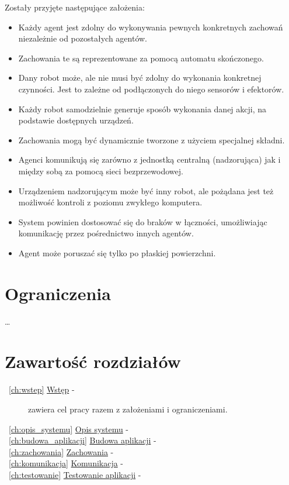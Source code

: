 Zostały przyjęte następujące założenia:
\begin{itemize}
  \item Każdy agent jest zdolny do wykonywania pewnych konkretnych zachowań niezależnie od pozostałych agentów.
  \item Zachowania te są reprezentowane za pomocą automatu skończonego.
  \item Dany robot może, ale nie musi być zdolny do wykonania konkretnej czynności. Jest to zależne od podłączonych do niego sensorów i efektorów.
  \item Każdy robot samodzielnie generuje sposób wykonania danej akcji, na podstawie dostępnych urządzeń.
  \item Zachowania mogą być dynamicznie tworzone z użyciem specjalnej składni.
  \item Agenci komunikują się zarówno z jednostką centralną (nadzorująca) jak i między sobą za pomocą sieci bezprzewodowej.
  \item Urządzeniem nadzorującym może być inny robot, ale pożądana jest też możliwość kontroli z poziomu zwykłego komputera.
  \item System powinien dostosować się do braków w łączności, umożliwiając komunikację przez pośrednictwo innych agentów.
  \item Agent może poruszać się tylko po płaskiej powierzchni.
\end{itemize}

\section{Ograniczenia}

\ldots

\section{Zawartość rozdziałów}

\begin{description}
  \item[ {~\ref{ch:wstep} \hyperref[ch:wstep]{Wstęp} -} ]zawiera cel pracy razem z założeniami i ograniczeniami.
  \item[ {~\ref{ch:opis_systemu} \hyperref[ch:opis_systemu]{Opis systemu} -} ]
  \item[ {~\ref{ch:budowa_aplikacji} \hyperref[ch:budowa_aplikacji]{Budowa aplikacji} -} ]
  \item[ {~\ref{ch:zachowania} \hyperref[ch:zachowania]{Zachowania} -} ]
  \item[ {~\ref{ch:komunikacja} \hyperref[ch:komunikacja]{Komunikacja} -} ]
  \item[ {~\ref{ch:testowanie} \hyperref[ch:testowanie]{Testowanie aplikacji} -} ]
\end{description}

